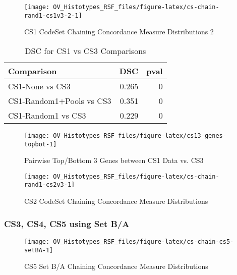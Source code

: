 \documentclass[
]{report}
\begin{document}
\begin{figure}[H]

{\centering \texttt{[image: OV\_Histotypes\_RSF\_files/figure-latex/cs-chain-rand1-cs1v3-2-1]} 

}

\caption{CS1 CodeSet Chaining Concordance Measure Distributions 2}\label{fig:cs-chain-rand1-cs1v3-2}
\end{figure}

\begin{table}

\caption{\label{tab:cs13-dsc}DSC for CS1 vs CS3 Comparisons}
\centering
\begin{tabular}[t]{l|r|r}
\hline
Comparison & DSC & pval\\
\hline
CS1-None vs CS3 & 0.265 & 0\\
\hline
CS1-Random1+Pools vs CS3 & 0.351 & 0\\
\hline
CS1-Random1 vs CS3 & 0.229 & 0\\
\hline
\end{tabular}
\end{table}

\begin{figure}[H]

{\centering \texttt{[image: OV\_Histotypes\_RSF\_files/figure-latex/cs13-genes-topbot-1]} 

}

\caption{Pairwise Top/Bottom 3 Genes between CS1 Data vs. CS3}\label{fig:cs13-genes-topbot}
\end{figure}

\begin{figure}[H]

{\centering \texttt{[image: OV\_Histotypes\_RSF\_files/figure-latex/cs-chain-rand1-cs2v3-1]} 

}

\caption{CS2 CodeSet Chaining Concordance Measure Distributions}\label{fig:cs-chain-rand1-cs2v3}
\end{figure}

\hypertarget{cs3-cs4-cs5-using-set-ba}{%
\subsubsection{CS3, CS4, CS5 using Set B/A}\label{cs3-cs4-cs5-using-set-ba}}

\begin{figure}[H]

{\centering \texttt{[image: OV\_Histotypes\_RSF\_files/figure-latex/cs-chain-cs5-setBA-1]} 

}

\caption{CS5 Set B/A Chaining Concordance  Measure Distributions}\label{fig:cs-chain-cs5-setBA}
\end{figure}
\end{document}
